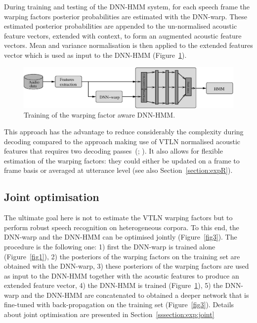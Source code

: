 \documentclass{nle}
\begin{document}
During training  and testing  of the DNN-HMM  system, for  each speech
frame the  warping factors posterior probabilities are  estimated with
the DNN-warp. These estimated  posterior probabilities are appended to
the un-normalised acoustic feature vectors, extended  with context, to
form an augmented acoustic feature vectors. Mean and variance normalisation is then applied to the extended features vector
which is used as input to the DNN-HMM (Figure~\ref{fig2}).
 \begin{figure}
       \includegraphics[width=\textwidth]{fig2}
         \caption{Training of the warping factor aware DNN-HMM.} 
    	\label{fig2}
 \end{figure}
 
This approach has the  advantage to reduce considerably the complexity
during decoding compared to the approach making use of VTLN normalised
acoustic features that requires two decoding passes~(\citealp{LeeRos96}; \citealp*{WelKanNey99}). It also allows for flexible estimation of the warping factors: they could either be updated on a frame to frame basis or averaged at utterance level (see also Section~\ref{section:expR}).

\subsection{Joint optimisation}
The ultimate goal here is not to estimate the VTLN warping factors but to perform robust speech recognition on heterogeneous corpora. To this end, the DNN-warp and the DNN-HMM can be optimised jointly (Figure~\ref{fig3}). The procedure is the following one: 1) first the DNN-warp is trained alone (Figure~\ref{fig1}), 2) the posteriors of the warping factors on the training set are obtained with the DNN-warp, 3) these posteriors of the warping factors are used as input to the DNN-HMM together with the acoustic features to produce an extended feature vector, 4) the DNN-HMM is trained (Figure~\ref{fig2}), 5)  the DNN-warp and the DNN-HMM are concatenated to obtained a deeper network that is fine-tuned with back-propagation on the training set (Figure~\ref{fig3}). Details about joint optimisation are presented in Section~\ref{sssection:exp:joint}
\end{document}
